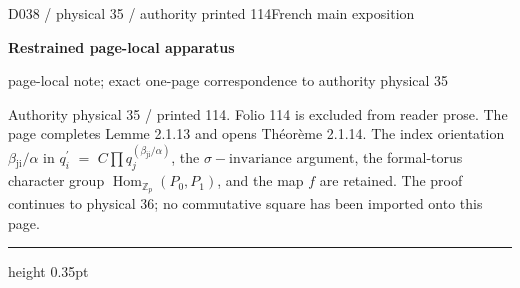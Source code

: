 \documentclass[9pt]{article}
\newcommand{\CanonText}[1]{\par{\fontsize{8.0}{9.35}\selectfont\RaggedRight #1\par}\vspace{2.2pt}}
\newcommand{\LayerTitle}{Restrained page-local apparatus}
\begin{document}
\noindent\begin{minipage}[t][\dimexpr\textheight-5pt\relax][t]{\textwidth}
{\sffamily\fontsize{7.3}{8.2}\selectfont\color{Quiet} D038 / physical 35 / authority printed 114\hfill French main exposition}
\par{}\vspace{4.5pt}
{\sffamily\fontsize{10.4}{11.6}\selectfont\bfseries\color{Accent} \LayerTitle}
\par{\sffamily\fontsize{6.7}{7.7}\selectfont\color{Quiet} page-local note; exact one-page correspondence to authority physical 35}
\vspace{5pt}
\CanonText{Authority physical 35 / printed 114. Folio 114 is excluded from reader prose. The page completes Lemme 2.1.13 and opens Théorème 2.1.14. The index orientation \(\beta{}_{\mathrm{ji}}/\alpha{}\) in \(q^{\prime}_{i}\) \(=\) \(C\prod{}q_{j}^{(\beta{}_{\mathrm{ji}}/\alpha{})}\), the \(\sigma{}-\text{invariance}\) argument, the formal-torus character group \(\operatorname{Hom}_{\mathbb{Z}_{p}}(P_{0},P_{1})\), and the map \(f\) are retained. The proof continues to physical 36; no commutative square has been imported onto this page.}
\vfill
{\color{Accent}\hrule height 0.35pt}\vspace{3pt}
\end{minipage}
\newpage
\end{document}
